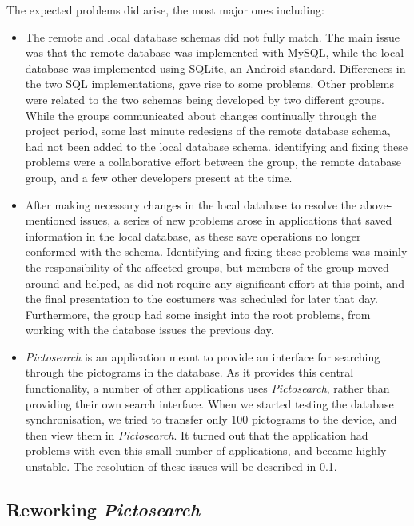 The expected problems did arise, the most major ones including:
\begin{itemize}
	\item The remote and local database schemas did not fully match. The main issue was that the remote database was implemented with MySQL, while the local database was implemented using SQLite, an Android standard. Differences in the two SQL implementations, gave rise to some problems. Other problems were related to the two schemas being developed by two different groups. While the groups communicated about changes continually through the project period, some last minute redesigns of the remote database schema, had not been added to the local database schema. identifying and fixing these problems were a collaborative effort between the \launcher group, the remote database group, and a few other developers present at the time. 
	\item After making necessary changes in the local database to resolve the above-mentioned issues, a series of new problems arose in applications that saved information in the local database, as these save operations no longer conformed with the schema. Identifying and fixing these problems was mainly the responsibility of the affected groups, but members of the \launcher group moved around and helped, as \launcher did not require any significant effort at this point, and the final presentation to the costumers was scheduled for later that day. Furthermore, the \launcher group had some insight into the root problems, from working with the database issues the previous day.
	\item \textit{Pictosearch} is an application meant to provide an interface for searching through the pictograms in the database. As it provides this central functionality, a number of other applications uses \textit{Pictosearch}, rather than providing their own search interface. When we started testing the database synchronisation, we tried to transfer only 100 pictograms to the device, and then view them in \textit{Pictosearch}. It turned out that the application had problems with even this small number of applications, and became highly unstable. The resolution of these issues will be described in \cref{sec:collab:remotedb:pictosearch}.
\end{itemize}

\subsection{Reworking \textit{Pictosearch}}
\label{sec:collab:remotedb:pictosearch}

